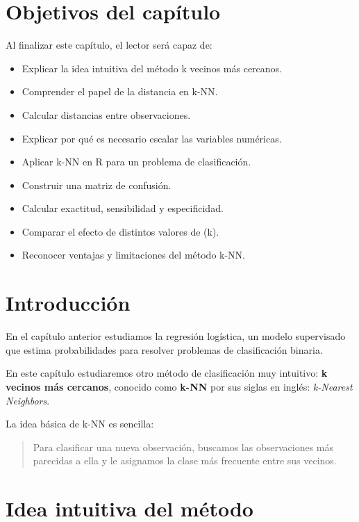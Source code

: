 \documentclass[
  11pt,
  letterpaper,
]{book}
\providecommand{\tightlist}{%
  \setlength{\itemsep}{0pt}\setlength{\parskip}{0pt}}
\begin{document}
\section{Objetivos del capítulo}\label{objetivos-del-capuxedtulo-4}

Al finalizar este capítulo, el lector será capaz de:

\begin{itemize}
\tightlist
\item
  Explicar la idea intuitiva del método k vecinos más cercanos.
\item
  Comprender el papel de la distancia en k-NN.
\item
  Calcular distancias entre observaciones.
\item
  Explicar por qué es necesario escalar las variables numéricas.
\item
  Aplicar k-NN en R para un problema de clasificación.
\item
  Construir una matriz de confusión.
\item
  Calcular exactitud, sensibilidad y especificidad.
\item
  Comparar el efecto de distintos valores de (k).
\item
  Reconocer ventajas y limitaciones del método k-NN.
\end{itemize}

\section{Introducción}\label{introducciuxf3n-4}

En el capítulo anterior estudiamos la regresión logística, un modelo
supervisado que estima probabilidades para resolver problemas de
clasificación binaria.

En este capítulo estudiaremos otro método de clasificación muy
intuitivo: \textbf{k vecinos más cercanos}, conocido como \textbf{k-NN}
por sus siglas en inglés: \emph{k-Nearest Neighbors}.

La idea básica de k-NN es sencilla:

\begin{quote}
Para clasificar una nueva observación, buscamos las observaciones más
parecidas a ella y le asignamos la clase más frecuente entre sus
vecinos.
\end{quote}

\section{Idea intuitiva del método}\label{idea-intuitiva-del-muxe9todo}
\end{document}
